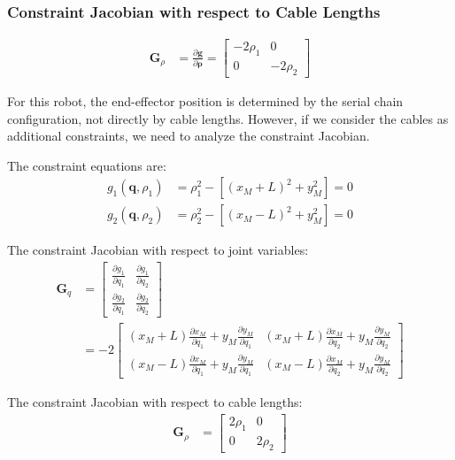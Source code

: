 \documentclass[11pt,a4paper]{article}
\begin{document}
\subsubsection{Constraint Jacobian with respect to Cable Lengths}
\begin{align}
\bm{G}_\rho &= \frac{\partial \bm{g}}{\partial \bm{\rho}} = \begin{bmatrix}
-2\rho_1 & 0 \\
0 & -2\rho_2
\end{bmatrix}
\end{align}

For this robot, the end-effector position is determined by the serial chain configuration, not directly by cable lengths. However, if we consider the cables as additional constraints, we need to analyze the constraint Jacobian.

The constraint equations are:
\begin{align}
g_1(\bm{q}, \rho_1) &= \rho_1^2 - [(x_M + L)^2 + y_M^2] = 0 \\
g_2(\bm{q}, \rho_2) &= \rho_2^2 - [(x_M - L)^2 + y_M^2] = 0
\end{align}

The constraint Jacobian with respect to joint variables:
\begin{align}
\bm{G}_q &= \begin{bmatrix}
\frac{\partial g_1}{\partial q_1} & \frac{\partial g_1}{\partial q_2} \\
\frac{\partial g_2}{\partial q_1} & \frac{\partial g_2}{\partial q_2}
\end{bmatrix} \\
&= -2\begin{bmatrix}
(x_M + L)\frac{\partial x_M}{\partial q_1} + y_M\frac{\partial y_M}{\partial q_1} & (x_M + L)\frac{\partial x_M}{\partial q_2} + y_M\frac{\partial y_M}{\partial q_2} \\
(x_M - L)\frac{\partial x_M}{\partial q_1} + y_M\frac{\partial y_M}{\partial q_1} & (x_M - L)\frac{\partial x_M}{\partial q_2} + y_M\frac{\partial y_M}{\partial q_2}
\end{bmatrix}
\end{align}

The constraint Jacobian with respect to cable lengths:
\begin{align}
\bm{G}_\rho &= \begin{bmatrix}
2\rho_1 & 0 \\
0 & 2\rho_2
\end{bmatrix}
\end{align}
\end{document}
